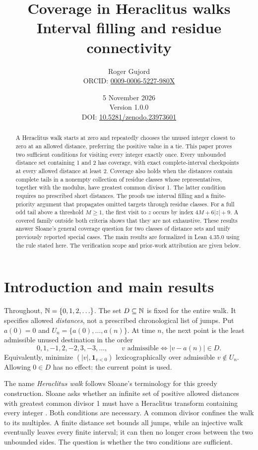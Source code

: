 \documentclass[11pt,a4paper]{article}
\title{Coverage in Heraclitus walks\\[5pt]\large Interval filling and residue connectivity}
\author{Roger Gujord\\\small ORCID: \href{https://orcid.org/0009-0006-5227-980X}{0009-0006-5227-980X}}
\date{5 November 2026\\\small Version 1.0.0\\[4pt]\footnotesize
DOI: \href{https://doi.org/10.5281/zenodo.23973601}{10.5281/zenodo.23973601}}
\begin{document}
\maketitle
\begin{abstract}
A Heraclitus walk starts at zero and repeatedly chooses the unused integer
closest to zero at an allowed distance, preferring the positive value in a
tie. This paper proves two sufficient conditions for visiting every integer
exactly once. Every unbounded distance set containing 1 and 2 has coverage,
with exact complete-interval checkpoints at every allowed distance at least
2. Coverage also holds when the distances contain complete tails in a
nonempty collection of residue classes whose representatives, together with
the modulus, have greatest common divisor 1. The latter condition requires
no prescribed short distances. The proofs use interval filling and a
finite-priority argument that propagates omitted targets through residue
classes. For a full odd tail above a threshold $M\ge1$, the first visit
to $z$ occurs by index $4M+6|z|+9$. A covered family outside both
criteria shows that they are not exhaustive. These results answer Sloane's general coverage question for two classes of
distance sets and unify previously reported special cases. The main results
are formalized in Lean 4.35.0 using the rule stated here. The verification
scope and prior-work attribution are given below.
\end{abstract}

\section{Introduction and main results}
Throughout, $\mathbb N=\{0,1,2,\ldots\}$. The set $D\subseteq\mathbb N$ is fixed for the entire
walk. It specifies allowed \emph{distances}, not a prescribed chronological
list of jumps. Put $a(0)=0$ and $U_n=\{a(0),\ldots,a(n)\}$. At time $n$,
the next point is the least admissible unused destination in the order
\[
0,1,-1,2,-2,3,-3,\ldots,
\qquad v\text{ admissible}\iff |v-a(n)|\in D.
\]
Equivalently, minimize $(|v|,\mathbf1_{v<0})$ lexicographically over admissible
$v\notin U_n$. Allowing $0\in D$ has no effect: the current point is used.

The name \emph{Heraclitus walk} follows Sloane's terminology for this
greedy construction.
Sloane asks whether an infinite set of positive allowed distances with
greatest common divisor 1 must have a Heraclitus transform containing every
integer \cite{sloane2025,sloane2026}. Both conditions are necessary. A common
divisor confines the walk to its multiples. A finite distance set bounds
all jumps, while an injective walk eventually leaves every finite interval;
it can then no longer cross between the two unbounded sides. The question
is whether the two conditions are sufficient.
\end{document}
